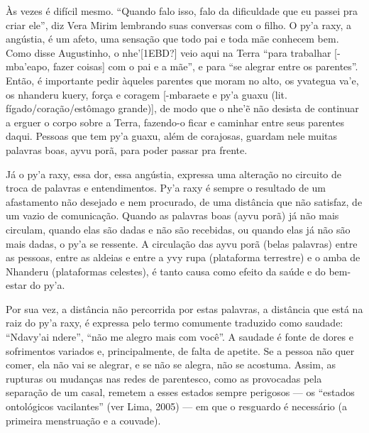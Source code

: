 \documentclass{article}
\begin{document}
\`As vezes \'e dif\'icil mesmo. {\textquotedblleft}Quando falo isso,
falo da dificuldade que eu passei pra criar ele{\textquotedblright},
diz Vera Mirim lembrando suas conversas com o filho. O
py{\textquoteright}a raxy, a ang\'ustia, \'e um afeto, uma
sensa\c{c}\~ao que todo pai e toda m\~ae conhecem bem. Como disse
Augustinho, o nhe{\textquoteright}[1EBD?] veio aqui na Terra
{\textquotedblleft}para trabalhar [-mba{\textquoteright}eapo, fazer
coisas] com o pai e a m\~ae{\textquotedblright}, e para
{\textquotedblleft}se alegrar entre os parentes{\textquotedblright}.
Ent\~ao, \'e importante pedir \`aqueles parentes que moram no alto, os
yvategua va{\textquoteright}e, os nhanderu kuery, for\c{c}a e coragem
[-mbaraete e py{\textquoteright}a guaxu (lit.
f\'igado/cora\c{c}\~ao/est\^omago grande)], de modo que o
nhe{\textquoteright}\~{e} n\~ao desista de continuar a erguer o corpo
sobre a Terra, fazendo-o ficar e caminhar entre seus parentes daqui.
Pessoas que tem py{\textquoteright}a guaxu, al\'em de corajosas,
guardam nele muitas palavras boas, ayvu por\~a, para poder passar pra
frente.

J\'a o py{\textquoteright}a raxy, essa dor, essa ang\'ustia, expressa
uma altera\c{c}\~ao no circuito de troca de palavras e entendimentos.
Py{\textquoteright}a raxy \'e sempre o resultado de um afastamento
n\~ao desejado e nem procurado, de uma dist\^ancia que n\~ao satisfaz,
de um vazio de comunica\c{c}\~ao. Quando as palavras boas (ayvu por\~a)
j\'a n\~ao mais circulam, quando elas s\~ao dadas e n\~ao s\~ao
recebidas, ou quando elas j\'a n\~ao s\~ao mais dadas, o
py{\textquoteright}a se ressente. A circula\c{c}\~ao das ayvu por\~a
(belas palavras) entre as pessoas, entre as aldeias e entre a yvy rupa
(plataforma terrestre) e o amba de Nhanderu (plataformas celestes), \'e
tanto causa como efeito da sa\'ude e do bem-estar do
py{\textquoteright}a.

Por sua vez, a dist\^ancia n\~ao percorrida por estas palavras, a
dist\^ancia que est\'a na raiz do py{\textquoteright}a raxy, \'e
expressa pelo termo comumente traduzido como saudade:
{\textquotedblleft}Ndavy{\textquoteright}ai ndere{\textquotedblright},
{\textquotedblleft}n\~ao me alegro mais com voc\^e{\textquotedblright}.
A saudade \'e fonte de dores e sofrimentos variados e, principalmente,
de falta de apetite. Se a pessoa n\~ao quer comer, ela n\~ao vai se
alegrar, e se n\~ao se alegra, n\~ao se acostuma. Assim, as rupturas ou
mudan\c{c}as nas redes de parentesco, como as provocadas pela
separa\c{c}\~ao de um casal, remetem a esses estados sempre perigosos
--- os {\textquotedblleft}estados ontol\'ogicos
vacilantes{\textquotedblright} (ver Lima, 2005) --- em que o resguardo
\'e necess\'ario (a primeira menstrua\c{c}\~ao e a couvade). 
\end{document}
